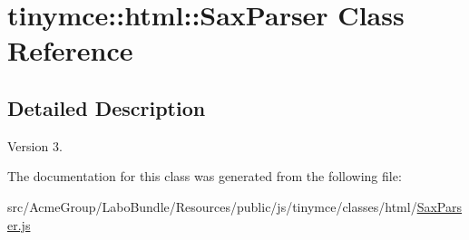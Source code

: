 \hypertarget{classtinymce_1_1html_1_1_sax_parser}{\section{tinymce\+:\+:html\+:\+:Sax\+Parser Class Reference}
\label{classtinymce_1_1html_1_1_sax_parser}
}


\subsection{Detailed Description}
\begin{DoxyVersion}{Version}
3. 
\end{DoxyVersion}


The documentation for this class was generated from the following file\+:\begin{DoxyCompactItemize}
\item 
src/\+Acme\+Group/\+Labo\+Bundle/\+Resources/public/js/tinymce/classes/html/\hyperlink{_sax_parser_8js}{Sax\+Parser.\+js}\end{DoxyCompactItemize}
